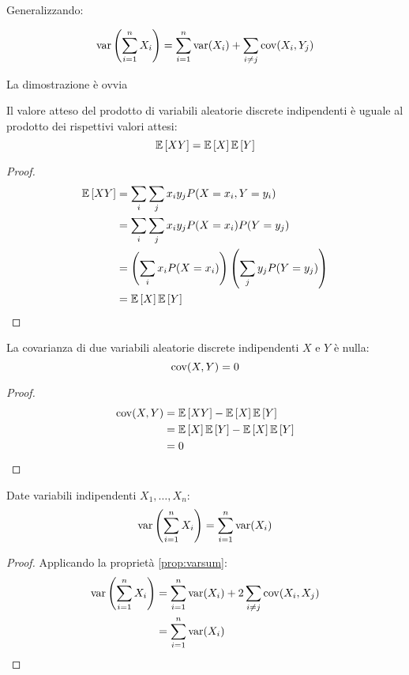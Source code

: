Generalizzando:
\begin{prop} \label{prop:varsumcov}
	\begin{equation*}
		\operatorname{var}\left(\sum_{i=1}^n X_i\right) = \sum_{i=1}^n \operatorname{var}(X_i) + \sum_{i\neq j}\operatorname{cov}(X_i,Y_j)
	\end{equation*}
\end{prop}
\noindent
La dimostrazione è ovvia

\begin{teor}
	Il valore atteso del prodotto di variabili aleatorie discrete indipendenti è uguale al prodotto dei rispettivi valori attesi:
	\begin{equation*}
		\mathbb{E}\left[ XY \right] = \mathbb{E}\left[ X \right]\mathbb{E}\left[ Y \right]
	\end{equation*}
\end{teor}
\begin{proof}
	\begin{align*}
		\mathbb{E}\left[ XY \right] & = \sum_i\sum_j x_i y_j P(X=x_i,Y=y_i)                              \\
		        & = \sum_i\sum_j x_i y_j P(X=x_i)P(Y=y_j)                            \\
		        & = \left(\sum_i x_i P(X=x_i)\right)\left(\sum_j y_j P(Y=y_j)\right) \\
		        & = \mathbb{E}\left[ X \right]\mathbb{E}\left[ Y \right]
	\end{align*}
\end{proof}

\begin{corol}
	La covarianza di due variabili aleatorie discrete indipendenti $X$ e $Y$ è nulla:
	\begin{equation*}
		\operatorname{cov}(X,Y) = 0
	\end{equation*}
\end{corol}
\begin{proof}
	\begin{align*}
		\operatorname{cov}(X,Y) & = \mathbb{E}\left[ XY \right]-\mathbb{E}\left[ X \right]\mathbb{E}\left[ Y \right]      \\
		          & = \mathbb{E}\left[ X \right]\mathbb{E}\left[ Y \right]-\mathbb{E}\left[ X \right]\mathbb{E}\left[ Y \right] \\
		          & = 0
	\end{align*}
\end{proof}

\begin{corol}
	Date variabili indipendenti $X_1,\dots,X_n$:
	\begin{equation*}
		\operatorname{var}\left(\sum_{i=1}^n X_i\right) = \sum_{i=1}^n \operatorname{var}(X_i)
	\end{equation*}
\end{corol}
\begin{proof}
	Applicando la proprietà \ref{prop:varsum}:
	\begin{align*}
		\operatorname{var}\left(\sum_{i=1}^n X_i\right) & = \sum_{i=1}^n\operatorname{var}(X_i)+2\sum_{i\neq j}\operatorname{cov}(X_i,X_j) \\
		                                  & = \sum_{i=1}^n \operatorname{var}(X_i)
	\end{align*}
\end{proof}


